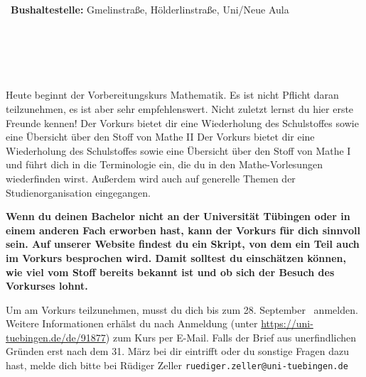 \begin{description}
~\textbf{Bushaltestelle:} Gmelinstraße, Hölderlinstraße, Uni/Neue Aula

\else
    \fi
\fi

\ifml
	\item~ %
\else
    \ifkogwiss
        \ifmaster
            \item~
        \fi
    \else
      \item[Montag, 04.Oktober \YEAR]\ \\
      Heute beginnt der Vorbereitungskurs Mathematik. Es ist nicht Pflicht daran teilzunehmen,
	es ist aber sehr empfehlenswert.
	Nicht zuletzt lernst du hier erste Freunde kennen!
	\ifsommersemester
	Der Vorkurs bietet dir eine Wiederholung des Schulstoffes sowie eine Übersicht über den Stoff von Mathe II
	\fi
	\ifwintersemester
	Der Vorkurs bietet dir eine Wiederholung des Schulstoffes sowie eine Übersicht über den Stoff von Mathe I
	\fi
	und führt dich in die Terminologie ein, die du in den Mathe-Vorlesungen wiederfinden wirst. Außerdem wird auch auf generelle Themen der Studienorganisation eingegangen.
	
	\ifmaster
	\textbf{Wenn du deinen Bachelor nicht an der Universität Tübingen oder in einem anderen Fach erworben hast, kann der Vorkurs für dich sinnvoll sein. Auf unserer Website findest du ein Skript, von dem ein Teil auch im Vorkurs besprochen wird. Damit solltest du einschätzen können, wie viel vom Stoff bereits bekannt ist und ob sich der Besuch des Vorkurses lohnt.}
	\fi
	
		Um am Vorkurs teilzunehmen, musst du dich bis zum 28. September \YEAR~anmelden. Weitere Informationen erhälst du nach Anmeldung (unter \url{https://uni-tuebingen.de/de/91877}) zum Kurs per E-Mail. Falls der Brief aus unerfindlichen Gründen erst nach dem 31. März bei dir eintrifft oder du sonstige Fragen dazu hast, melde dich bitte bei Rüdiger Zeller \texttt{ruediger.zeller@uni-tuebingen.de}\\


\end{description}
